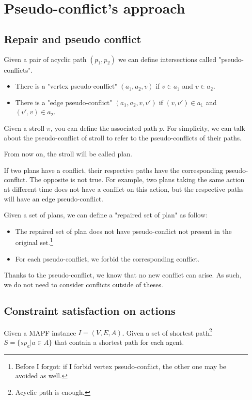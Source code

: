 \section{Pseudo-conflict's approach}\label{sec:approach}

\subsection{Repair and pseudo conflict}
Given a pair of acyclic path $(p_1,p_2)$ we can define intersections called "pseudo-conflicts".

\begin{itemize}
  \item There is a "vertex pseudo-conflict" $(a_1,a_2,v)$ if $v \in a_1$ and $v \in a_2$.
  \item There is a "edge pseudo-conflict" $(a_1,a_2,v,v')$ if $(v,v') \in a_1$ and $(v',v) \in a_2$.
\end{itemize}

Given a stroll $\pi$, you can define the associated path $p$. For simplicity, we can talk about the pseudo-conflict of stroll to refer to the pseudo-conflicts of their paths.

From now on, the stroll will be called plan.

If two plans have a conflict, their respective paths have the corresponding pseudo-conflict. The opposite is not true. For example, two plans taking the same action at different time does not have a conflict on this action, but the respective paths will have an edge pseudo-conflict.

Given a set of plans, we can define a "repaired set of plan" as follow:
\begin{itemize}
  \item The repaired set of plan does not have pseudo-conflict not present in the original set.\footnote{Before I forgot: if I forbid vertex pseudo-conflict, the other one may be avoided as well.}
  \item For each pseudo-conflict, we forbid the corresponding conflict.
\end{itemize}
Thanks to the pseudo-conflict, we know that no new conflict can arise. As such, we do not need to consider conflicts outside of theses.

\subsection{Constraint satisfaction on actions}
Given a MAPF instance $I=(V,E,A)$.
Given a set of shortest path\footnote{Acyclic path is enough.} $S = \{sp_a | a \in A \}$ that contain a shortest path for each agent.

